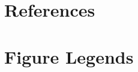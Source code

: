 \documentclass[10pt,letterpaper]{article}
\begin{document}
\section*{References}
%
%
% 




\section*{Figure Legends}
%




\end{document}
